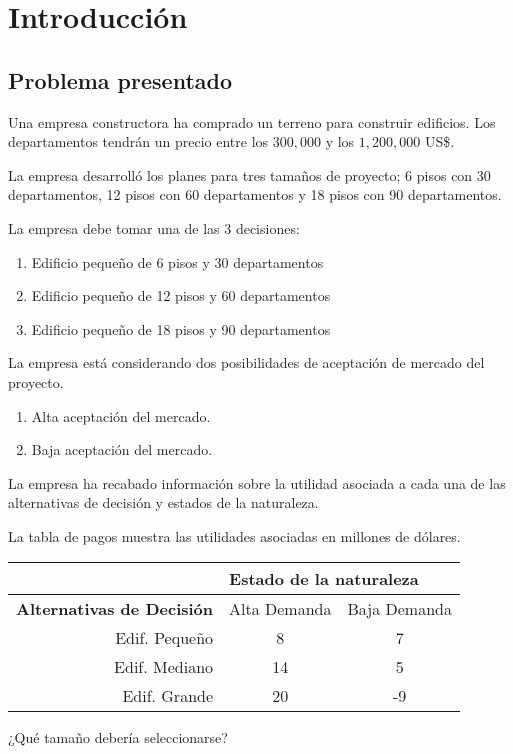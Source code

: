 \section{Introducción}
\lipsum[3]

\subsection{Problema presentado}
Una empresa constructora ha comprado un terreno para construir edificios. Los departamentos tendrán un precio entre los $300,000$ y los $1,200,000$ US\$.

La empresa desarrolló los planes para tres tamaños de proyecto; 6 pisos con 30 departamentos, 12 pisos con 60 departamentos y 18 pisos con 90 departamentos.

La empresa debe tomar una de las 3 decisiones:

\begin{enumerate}
    \item Edificio pequeño de 6 pisos y 30 departamentos
    \item Edificio pequeño de 12 pisos y 60 departamentos
    \item Edificio pequeño de 18 pisos y 90 departamentos
\end{enumerate}

La empresa está considerando dos posibilidades de aceptación de mercado del proyecto.

\begin{enumerate}
    \item Alta aceptación del mercado.
    \item Baja aceptación del mercado.
\end{enumerate}

La empresa ha recabado información sobre la utilidad asociada a cada una de las alternativas de decisión y estados de la naturaleza.

La tabla de pagos muestra las utilidades asociadas en millones de dólares.

\begin{table}[H]
    \begin{tabular}{r|cc|}
        \cline{2-3}
        \multicolumn{1}{l|}{}                                   & \multicolumn{2}{l|}{\textbf{Estado de la naturaleza}}                                     \\ \hline
        \multicolumn{1}{|l|}{\textbf{Alternativas de Decisión}} & \multicolumn{1}{l|}{Alta Demanda}                     & \multicolumn{1}{l|}{Baja Demanda} \\ \hline
        \multicolumn{1}{|r|}{Edif. Pequeño}                     & \multicolumn{1}{c|}{8}                                & 7                                 \\
        \multicolumn{1}{|r|}{Edif. Mediano}                     & \multicolumn{1}{c|}{14}                               & 5                                 \\
        \multicolumn{1}{|r|}{Edif. Grande}                      & \multicolumn{1}{c|}{20}                               & -9                                \\ \hline
    \end{tabular}
\end{table}

¿Qué tamaño debería seleccionarse?